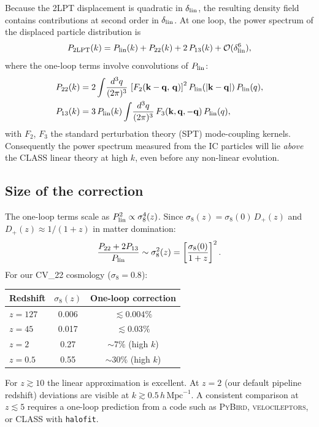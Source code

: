 \documentclass[12pt]{article}
\newcommand{\bk}{\mathbf{k}}
\newcommand{\Dp}{D_+}
\begin{document}
Because the 2LPT displacement is quadratic in $\delta_{\rm lin}$, the
resulting density field contains contributions at second order in
$\delta_{\rm lin}$.  At one loop, the power spectrum of the displaced
particle distribution is \citep{Bernardeau2002}
%
\begin{equation}
  P_{\rm 2LPT}(k)
    = P_{\rm lin}(k)
    + P_{22}(k)
    + 2\,P_{13}(k)
    + \mathcal{O}(\delta_{\rm lin}^6),
  \label{eq:pk_loop}
\end{equation}
%
where the one-loop terms involve convolutions of $P_{\rm lin}$:
%
\begin{align}
  P_{22}(k) &= 2\int\!\frac{d^3q}{(2\pi)^3}\,
    \left[F_2(\bk-\mathbf{q},\,\mathbf{q})\right]^2
    P_{\rm lin}(|\bk-\mathbf{q}|)\,P_{\rm lin}(q), \\
  P_{13}(k) &= 3\,P_{\rm lin}(k)\int\!\frac{d^3q}{(2\pi)^3}\,
    F_3(\bk,\mathbf{q},-\mathbf{q})\,P_{\rm lin}(q),
\end{align}
%
with $F_2$, $F_3$ the standard perturbation theory (SPT) mode-coupling
kernels.  Consequently the power spectrum measured from the IC
particles will lie \emph{above} the CLASS linear theory at high $k$,
even before any non-linear evolution.

\subsection{Size of the correction}

The one-loop terms scale as $P_{\rm lin}^2 \propto \sigma_8^4(z)$.
Since $\sigma_8(z) = \sigma_8(0)\,\Dp(z)$ and $\Dp(z) \approx
1/(1+z)$ in matter domination:
%
\begin{equation}
  \frac{P_{22}+2P_{13}}{P_{\rm lin}} \sim \sigma_8^2(z)
    = \left[\frac{\sigma_8(0)}{1+z}\right]^2.
\end{equation}
%
For our CV\_22 cosmology ($\sigma_8 = 0.8$):
%
\begin{center}
\begin{tabular}{lcc}
\hline
Redshift & $\sigma_8(z)$ & One-loop correction \\
\hline
$z = 127$ & 0.006 & $\lesssim 0.004\%$ \\
$z = 45$  & 0.017 & $\lesssim 0.03\%$  \\
$z = 2$   & 0.27  & $\sim 7\%$ (high $k$) \\
$z = 0.5$ & 0.55  & $\sim 30\%$ (high $k$) \\
\hline
\end{tabular}
\end{center}
%
For $z \gtrsim 10$ the linear approximation is excellent.  At $z = 2$
(our default pipeline redshift) deviations are visible at $k \gtrsim
0.5\,h\,\mathrm{Mpc}^{-1}$.  A consistent comparison at $z \lesssim 5$
requires a one-loop prediction from a code such as \textsc{PyBird},
\textsc{velocileptors}, or CLASS with \texttt{halofit}.
\end{document}
